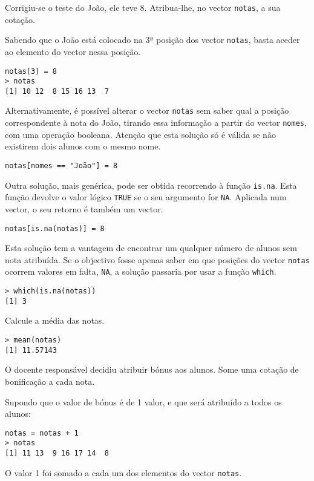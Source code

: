 \documentclass{exam}
\begin{document}
\begin{questions}
\question Corrigiu-se o teste do João, ele teve 8. Atribua-lhe, no vector \texttt{notas}, a sua cotação.
\begin{solution}
	Sabendo que o João está colocado na 3ª posição dos vector \texttt{notas}, basta aceder ao elemento do vector nessa posição.
	\begin{verbatim}
notas[3] = 8
> notas
[1] 10 12  8 15 16 13  7
	\end{verbatim}
	Alternativamente, é possível alterar o vector \texttt{notas} sem saber qual a posição correspondente à nota do João, tirando essa informação a partir do vector \texttt{nomes}, com uma operação booleana. Atenção que esta solução só é válida se não existirem dois alunos com o mesmo nome.
	\begin{verbatim}
notas[nomes == "João"] = 8
	\end{verbatim}
	Outra solução, mais genérica, pode ser obtida recorrendo à função \texttt{is.na}. Esta função devolve o valor lógico \texttt{TRUE} se o seu argumento for \texttt{NA}. Aplicada num vector, o seu retorno é também um vector.
	\begin{verbatim}
notas[is.na(notas)] = 8
	\end{verbatim}
	Esta solução tem a vantagem de encontrar um qualquer número de alunos sem nota atribuída. Se o objectivo fosse apenas saber em que posições do vector \texttt{notas} ocorrem valores em falta, \texttt{NA}, a solução passaria por usar a função \texttt{which}.
	\begin{verbatim}
> which(is.na(notas))
[1] 3
	\end{verbatim}
\end{solution}

\question Calcule a média das notas.
\begin{solution}
	\begin{verbatim}
> mean(notas)
[1] 11.57143
	\end{verbatim}
\end{solution}

\question O docente responsável decidiu atribuir bónus aos alunos. Some uma cotação de bonificação a cada nota.
\begin{solution}
	Supondo que o valor de bónus é de 1 valor, e que será atribuído a todos os alunos:
	\begin{verbatim}
notas = notas + 1
> notas
[1] 11 13  9 16 17 14  8
	\end{verbatim}
	O valor 1 foi somado a cada um dos elementos do vector \texttt{notas}.
	

\end{solution}
\end{questions}
\end{document}
